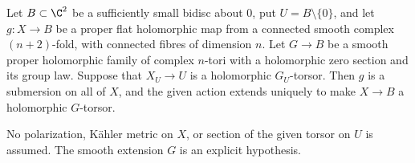 
\begin{proposition}\hypertarget{tag-032W}{}\label{push:src:E.2.11}


Let $B\subset\C^2$ be a sufficiently small bidisc about $0$, put
$U=B\setminus\{0\}$, and let $g:X\to B$ be a proper flat
holomorphic map from a connected smooth complex $(n+2)$-fold,
with connected fibres of dimension $n$.  Let $G\to B$ be a
smooth proper holomorphic family of complex $n$-tori with a
holomorphic zero section and its group law.  Suppose that
$X_U\to U$ is a holomorphic $G_U$-torsor.  Then $g$ is a
submersion on all of $X$, and the given action extends uniquely
to make $X\to B$ a holomorphic $G$-torsor.

No polarization, K\"ahler metric on $X$, or section of the
given torsor on $U$ is assumed.  The smooth extension $G$ is
an explicit hypothesis.
\end{proposition}

